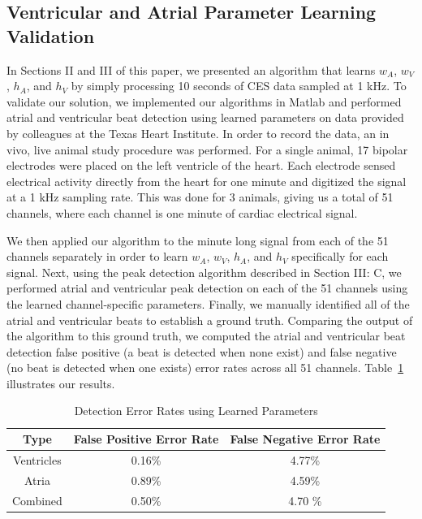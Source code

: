 \documentclass[conference]{IEEEtran}
\newcommand{\APW}{\ensuremath{w_A}}
\newcommand{\VPW}{\ensuremath{w_V}}
\newcommand{\APH}{\ensuremath{h_A}}
\newcommand{\VPH}{\ensuremath{h_V}}
\begin{document}
\subsection{Ventricular and Atrial Parameter Learning Validation}
In Sections II and III of this paper, we presented an
algorithm that learns \APW{}, \VPW{}, \APH{}, and \VPH{} by
simply processing 10 seconds of CES data sampled at 1
kHz. To validate our solution, we implemented our algorithms in
Matlab and performed atrial and ventricular beat
detection using learned parameters on
data provided by colleagues at the Texas Heart Institute.
In order to record the data, an in vivo,
live animal study procedure was performed. For a single
animal, 17 bipolar electrodes were placed on the left ventricle
of the heart. Each electrode sensed electrical activity
directly from the heart for one minute and digitized the
signal at a 1 kHz sampling rate.
This was done for 3 animals, giving us a total
of 51 channels, where each channel is one minute of cardiac electrical signal.

We then applied our algorithm to the minute long signal
from each of the 51 channels separately in order to learn
\APW{}, \VPW{}, \APH{}, and \VPH{} specifically for each
signal. Next, using the peak detection algorithm
described in Section III: C, we performed atrial and
ventricular peak detection on each of the 51 channels
using the learned channel-specific parameters.
Finally, we manually identified all of the atrial and ventricular beats to establish a ground truth. 
Comparing the output of the algorithm to this ground truth, we computed the
atrial and ventricular beat detection 
false positive (a beat is detected when none
exist) and false negative (no beat is detected when one
exists) error rates across all 51 channels.
Table~\ref{tab:errors} illustrates our results.
\begin{table}[h]
	\caption{Detection Error Rates using Learned Parameters}
	\label{tab:errors}
	\centering
	\begin{tabular}{|c|c|c|}
		\hline
		Type & False Positive Error Rate & False Negative Error Rate \\
		\hline 
		Ventricles & 0.16\% &4.77\% \\
		\hline
		Atria & 0.89\% & 4.59\% \\
		\hline
		Combined & 0.50\% & 4.70 \% \\
		\hline
	\end{tabular}
\end{table}
\end{document}
